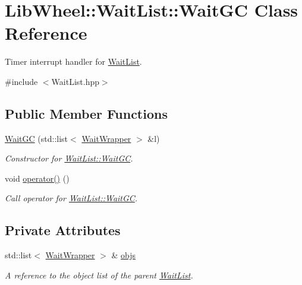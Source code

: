 \hypertarget{classLibWheel_1_1WaitList_1_1WaitGC}{
\section{\-Lib\-Wheel\-:\-:\-Wait\-List\-:\-:\-Wait\-G\-C \-Class \-Reference}
\label{classLibWheel_1_1WaitList_1_1WaitGC}
}


\-Timer interrupt handler for \hyperlink{classLibWheel_1_1WaitList}{\-Wait\-List}.  




{\ttfamily \#include $<$\-Wait\-List.\-hpp$>$}

\subsection*{\-Public \-Member \-Functions}
\begin{DoxyCompactItemize}
\item 
\hyperlink{classLibWheel_1_1WaitList_1_1WaitGC_aaf69f8d97ba51509c95a559f6a62831e}{\-Wait\-G\-C} (std\-::list$<$ \hyperlink{classLibWheel_1_1WaitList_1_1WaitWrapper}{\-Wait\-Wrapper} $>$ \&l)
\begin{DoxyCompactList}\small\item\em \-Constructor for \hyperlink{classLibWheel_1_1WaitList_1_1WaitGC}{\-Wait\-List\-::\-Wait\-G\-C}. \end{DoxyCompactList}\item 
void \hyperlink{classLibWheel_1_1WaitList_1_1WaitGC_afb5c536ce88b8c365753e2e491135f55}{operator()} ()
\begin{DoxyCompactList}\small\item\em \-Call operator for \hyperlink{classLibWheel_1_1WaitList_1_1WaitGC}{\-Wait\-List\-::\-Wait\-G\-C}. \end{DoxyCompactList}\end{DoxyCompactItemize}
\subsection*{\-Private \-Attributes}
\begin{DoxyCompactItemize}
\item 
std\-::list$<$ \hyperlink{classLibWheel_1_1WaitList_1_1WaitWrapper}{\-Wait\-Wrapper} $>$ \& \hyperlink{classLibWheel_1_1WaitList_1_1WaitGC_a38657b9343752161a6380f8d6204e986}{objs}
\begin{DoxyCompactList}\small\item\em \-A reference to the object list of the parent \hyperlink{classLibWheel_1_1WaitList}{\-Wait\-List}. \end{DoxyCompactList}\end{DoxyCompactItemize}


